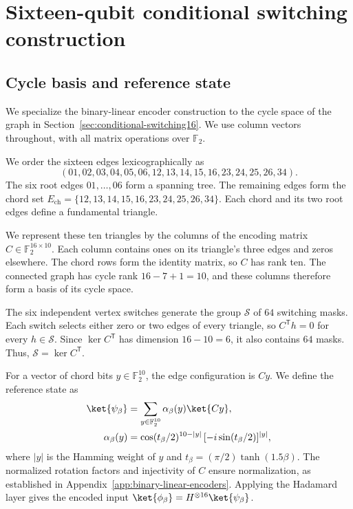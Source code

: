\section{Sixteen-qubit conditional switching construction}
\label{app:switching16}

\subsection{Cycle basis and reference state}

We specialize the binary-linear encoder construction to the cycle space of the graph in Section~\ref{sec:conditional-switching16}. We use column vectors throughout, with all matrix operations over $\mathbb F_2$.

We order the sixteen edges lexicographically as
\begin{equation}
 (01,02,03,04,05,06,12,13,14,15,16,23,24,25,26,34).
\end{equation}
The six root edges $01,\ldots,06$ form a spanning tree. The remaining edges form the chord set $E_{\mathrm{ch}}=\{12,13,14,15,16,23,24,25,26,34\}$. Each chord and its two root edges define a fundamental triangle.

We represent these ten triangles by the columns of the encoding matrix $C\in\mathbb F_2^{16\times10}$. Each column contains ones on its triangle's three edges and zeros elsewhere. The chord rows form the identity matrix, so $C$ has rank ten. The connected graph has cycle rank $16-7+1=10$, and these columns therefore form a basis of its cycle space.

The six independent vertex switches generate the group $\mathcal S$ of $64$ switching masks. Each switch selects either zero or two edges of every triangle, so $C^{\mathsf T}h=0$ for every $h\in\mathcal S$. Since $\ker C^{\mathsf T}$ has dimension $16-10=6$, it also contains $64$ masks. Thus, $\mathcal S=\ker C^{\mathsf T}$.

For a vector of chord bits $y\in\mathbb F_2^{10}$, the edge configuration is $Cy$. We define the reference state as
\begin{align}
 \ket{\psi_\beta}
 &=\sum_{y\in\mathbb F_2^{10}}\alpha_\beta(y)\ket{Cy},\\
 \alpha_\beta(y)&=\cos(t_\beta/2)^{10-|y|}\,[-i\sin(t_\beta/2)]^{|y|},
\end{align}
where $|y|$ is the Hamming weight of $y$ and $t_\beta=(\pi/2)\tanh(1.5\beta)$. The normalized rotation factors and injectivity of $C$ ensure normalization, as established in Appendix~\ref{app:binary-linear-encoders}. Applying the Hadamard layer gives the encoded input $\ket{\phi_\beta}=H^{\otimes16}\ket{\psi_\beta}$.

